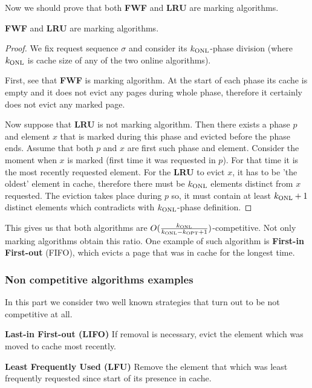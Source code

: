 Now we should prove that both \textbf{FWF} and \textbf{LRU} are
marking algorithms.
\begin{propo}
 \textbf{FWF} and \textbf{LRU} are marking algorithms.
\end{propo}
\begin{proof}
 We fix request sequence $\sigma$ and consider its $k_{\mathrm{ONL}}$-phase division 
(where $k_{\mathrm{ONL}}$ is cache size of any of the two online algorithms).

First, see that \textbf{FWF} is marking algorithm. At the start of each phase 
its cache is empty and it does not evict any pages during whole phase, 
therefore it certainly does not evict any marked page.

Now suppose that \textbf{LRU} is not marking algorithm. Then there exists a 
phase $p$ and element $x$ that is marked during this phase and evicted before 
the phase ends. Assume that both $p$ and $x$ are first such phase and element. 
Consider the moment when $x$ is marked (first time it was requested in $p$). 
For that time it is the most recently requested element. For the \textbf{LRU} to 
evict $x$, it has to be 'the oldest' element in cache, therefore there must be 
$k_{\mathrm{ONL}}$ elements distinct from $x$ requested. The eviction takes place 
during $p$ so, it must contain 
at least $k_{\mathrm{ONL}}+1$ distinct elements which contradicts with $k_{\mathrm{ONL}}$-phase definition. 
\end{proof}
This gives us that both algorithms are $O(\frac{k_{\mathrm{ONL}}}{k_{\mathrm{ONL}}-k_{\mathrm{OPT}}+1})$-competitive. Not 
only marking algorithms obtain this ratio. One example of such algorithm is 
\textbf{First-in First-out} (FIFO), which evicts a page that was in cache for 
the longest time.

\subsubsection{Non competitive algorithms examples}
In this part we consider two well known strategies that turn out to be not 
competitive at all.
\begin{myalgo}
 \textbf{Last-in First-out (LIFO)}
 \newline
If removal is necessary, evict the element which was moved to cache most 
recently.
\end{myalgo}
\begin{myalgo}
 \textbf{Least Frequently Used (LFU)}
 \newline
Remove the element that which was least frequently requested since start of its 
presence in cache.
\end{myalgo}

